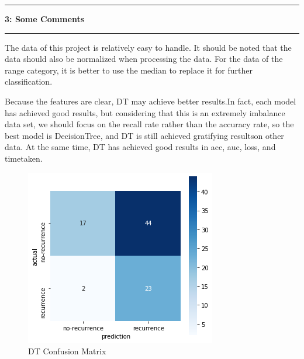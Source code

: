 \documentclass[11pt]{article}
\newcommand\question[2]{\vspace{.25in}\hrule\textbf{#1: #2}\vspace{.5em}\hrule\vspace{.10in}}
\begin{document}
\question{3}{Some Comments}
The data of this project is relatively easy to handle. It should be noted that the data should also be normalized when processing the data. For the data of the range category, it is better to use the median to replace it for further classification.

Because the features are clear, DT may achieve better results.In fact, each model has achieved good results, but considering that this is an extremely imbalance data set, we should focus on the recall rate rather than the accuracy rate, so the best model is DecisionTree, and DT is still achieved gratifying resultson other data.
At the same time, DT has achieved good results in acc, auc, loss, and timetaken.

\begin{figure}[H]
    \centering
    \includegraphics{Fig7}
    \caption{DT Confusion Matrix}
\end{figure}
\end{document}
